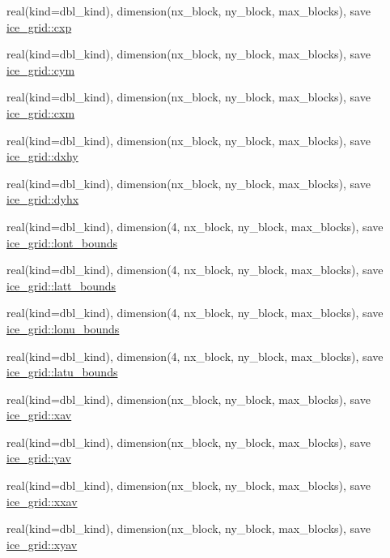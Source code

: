 \begin{DoxyCompactItemize}
real(kind=dbl\_\-kind), dimension(nx\_\-block, ny\_\-block, max\_\-blocks), save \hyperlink{namespaceice__grid_a3c40a8ee2794b13b04b0598c90bf420f}{ice\_\-grid::cxp}
\item 
real(kind=dbl\_\-kind), dimension(nx\_\-block, ny\_\-block, max\_\-blocks), save \hyperlink{namespaceice__grid_adb5e2792c5861e949ad784e35f485c08}{ice\_\-grid::cym}
\item 
real(kind=dbl\_\-kind), dimension(nx\_\-block, ny\_\-block, max\_\-blocks), save \hyperlink{namespaceice__grid_a83a8de6d0e58a6771b3d915acd63afd7}{ice\_\-grid::cxm}
\item 
real(kind=dbl\_\-kind), dimension(nx\_\-block, ny\_\-block, max\_\-blocks), save \hyperlink{namespaceice__grid_a0247c390ce33b9435bbff4edbff8b9e7}{ice\_\-grid::dxhy}
\item 
real(kind=dbl\_\-kind), dimension(nx\_\-block, ny\_\-block, max\_\-blocks), save \hyperlink{namespaceice__grid_ab6ee5703ec9bc808f8ebcf436960d722}{ice\_\-grid::dyhx}
\item 
real(kind=dbl\_\-kind), dimension(4, nx\_\-block, ny\_\-block, max\_\-blocks), save \hyperlink{namespaceice__grid_ae3bd428fa166bb43e833ff27111c5d8e}{ice\_\-grid::lont\_\-bounds}
\item 
real(kind=dbl\_\-kind), dimension(4, nx\_\-block, ny\_\-block, max\_\-blocks), save \hyperlink{namespaceice__grid_ab343eaee175150d30612b98bf5e83faf}{ice\_\-grid::latt\_\-bounds}
\item 
real(kind=dbl\_\-kind), dimension(4, nx\_\-block, ny\_\-block, max\_\-blocks), save \hyperlink{namespaceice__grid_abaf36c701426b67cd588146d434b1f99}{ice\_\-grid::lonu\_\-bounds}
\item 
real(kind=dbl\_\-kind), dimension(4, nx\_\-block, ny\_\-block, max\_\-blocks), save \hyperlink{namespaceice__grid_a03b1e73bc95079d90193478f58f192ce}{ice\_\-grid::latu\_\-bounds}
\item 
real(kind=dbl\_\-kind), dimension(nx\_\-block, ny\_\-block, max\_\-blocks), save \hyperlink{namespaceice__grid_aa84e4b92963d682ab3222a9d5716cbe8}{ice\_\-grid::xav}
\item 
real(kind=dbl\_\-kind), dimension(nx\_\-block, ny\_\-block, max\_\-blocks), save \hyperlink{namespaceice__grid_a637cce7adf54c42ab41eeaf347cf824e}{ice\_\-grid::yav}
\item 
real(kind=dbl\_\-kind), dimension(nx\_\-block, ny\_\-block, max\_\-blocks), save \hyperlink{namespaceice__grid_a7c8bb3b029d335971804fce931af7a4b}{ice\_\-grid::xxav}
\item 
real(kind=dbl\_\-kind), dimension(nx\_\-block, ny\_\-block, max\_\-blocks), save \hyperlink{namespaceice__grid_aa4182840814568ebe32038898cd5a7ad}{ice\_\-grid::xyav}

\end{DoxyCompactItemize}
